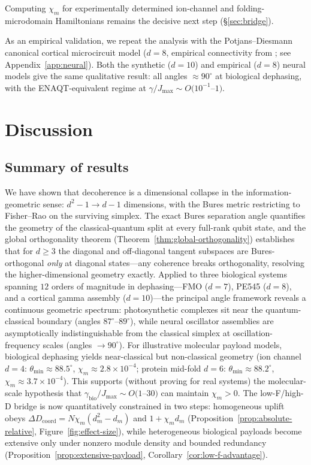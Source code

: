 \documentclass[12pt,a4paper]{article}
\theoremstyle{definition}
\theoremstyle{remark}
\begin{document}
Computing $\chi_m$ for experimentally determined ion-channel and folding-microdomain Hamiltonians remains the decisive next step (\S\ref{sec:bridge}).

As an empirical validation, we repeat the analysis with the Potjans--Diesmann canonical cortical microcircuit model ($d = 8$, empirical connectivity from \cite{potjans2014cell}; see Appendix~\ref{app:neural}). Both the synthetic ($d = 10$) and empirical ($d = 8$) neural models give the same qualitative result: all angles $\approx 90^\circ$ at biological dephasing, with the ENAQT-equivalent regime at $\gamma/J_{\max} \sim O(10^{-1}$--$1)$.

\section{Discussion}
\label{sec:discussion}

\subsection{Summary of results}

We have shown that decoherence is a dimensional collapse in the information-geometric sense: $d^2 - 1 \to d - 1$ dimensions, with the Bures metric restricting to Fisher--Rao on the surviving simplex. The exact Bures separation angle quantifies the geometry of the classical-quantum split at every full-rank qubit state, and the global orthogonality theorem (Theorem~\ref{thm:global-orthogonality}) establishes that for $d \geq 3$ the diagonal and off-diagonal tangent subspaces are Bures-orthogonal \emph{only} at diagonal states---any coherence breaks orthogonality, resolving the higher-dimensional geometry exactly. Applied to three biological systems spanning $12$ orders of magnitude in dephasing---FMO ($d = 7$), PE545 ($d = 8$), and a cortical gamma assembly ($d = 10$)---the principal angle framework reveals a continuous geometric spectrum: photosynthetic complexes sit near the quantum-classical boundary (angles $87^\circ$--$89^\circ$), while neural oscillator assemblies are asymptotically indistinguishable from the classical simplex at oscillation-frequency scales (angles $\to 90^\circ$). For illustrative molecular payload models, biological dephasing yields near-classical but non-classical geometry (ion channel $d=4$: $\theta_{\min}\approx88.5^\circ$, $\chi_m\approx2.8\times10^{-4}$; protein mid-fold $d=6$: $\theta_{\min}\approx88.2^\circ$, $\chi_m\approx3.7\times10^{-4}$). This supports (without proving for real systems) the molecular-scale hypothesis that $\gamma_{\mathrm{bio}}/J_{\max}\sim O(1$--$30)$ can maintain $\chi_m>0$. The low-F/high-D bridge is now quantitatively constrained in two steps: homogeneous uplift obeys $\Delta D_{\mathrm{coord}}=N\chi_m(d_m^2-d_m)$ and $1+\chi_m d_m$ (Proposition~\ref{prop:absolute-relative}, Figure~\ref{fig:effect-size}), while heterogeneous biological payloads become extensive only under nonzero module density and bounded redundancy (Proposition~\ref{prop:extensive-payload}, Corollary~\ref{cor:low-f-advantage}).
\end{document}
